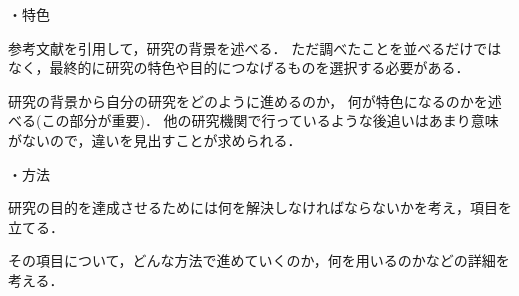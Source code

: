 \documentclass[a4paper]{jarticle}
\begin{document}

%
%
%
%
・特色{
参考文献を引用して，研究の背景を述べる．
ただ調べたことを並べるだけではなく，最終的に研究の特色や目的につなげるものを選択する必要がある．

研究の背景から自分の研究をどのように進めるのか，
何が特色になるのかを述べる(この部分が重要)．
他の研究機関で行っているような後追いはあまり意味がないので，違いを見出すことが求められる．
}
%
%
%
%
・方法{
研究の目的を達成させるためには何を解決しなければならないかを考え，項目を立てる．

その項目について，どんな方法で進めていくのか，何を用いるのかなどの詳細を考える．
}
%
%

\end{document}
